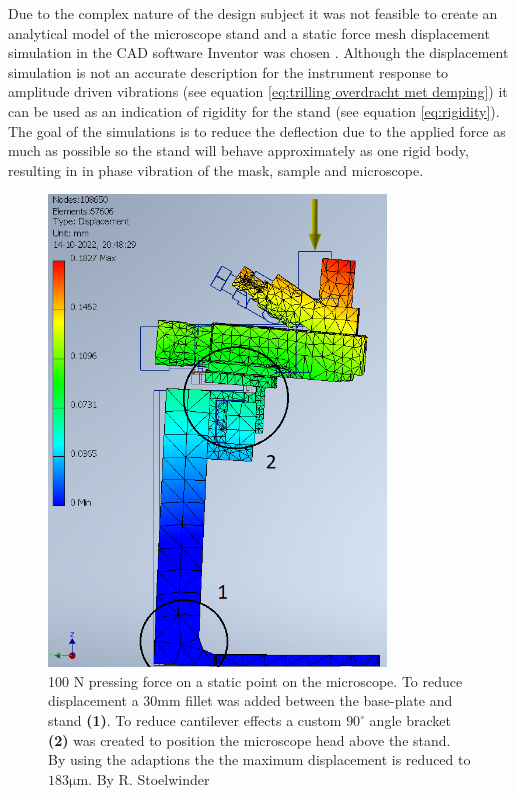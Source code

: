 \documentclass[10pt]{article}
\begin{document}
Due to the complex nature of the design subject it was not feasible to create an analytical model of the microscope stand and a static force mesh displacement simulation in the CAD software Inventor was chosen \cite{EvaluateStressDisplacement}. 
Although the displacement simulation is not an accurate description for the instrument response to amplitude driven vibrations (see equation \ref{eq:trilling overdracht met demping}) it can be used as an indication of rigidity for the stand (see equation \ref{eq:rigidity}).
The goal of the simulations is to reduce the deflection due to the applied force as much as possible so the stand will behave approximately as one rigid body, resulting in in phase vibration of the mask, sample and microscope.

\begin{figure}[H]
  \centering
  \begin{minipage}[b]{0.45\textwidth}
    \includegraphics[width=0.8\textwidth]{img/rigidity_simulation/study_4.png}
    \caption{100 N pressing force on a static point on the microscope. To reduce displacement a $30\mathrm{mm}$ fillet was added between the base-plate and stand \textbf{(1)}. To reduce cantilever effects a custom $90^\circ$ angle bracket \textbf{(2)} was created to position the microscope head above the stand. By using the adaptions the the maximum displacement is reduced to $183\mathrm{\mu m}$. By R. Stoelwinder }

\end{minipage}
\end{figure}
\end{document}

